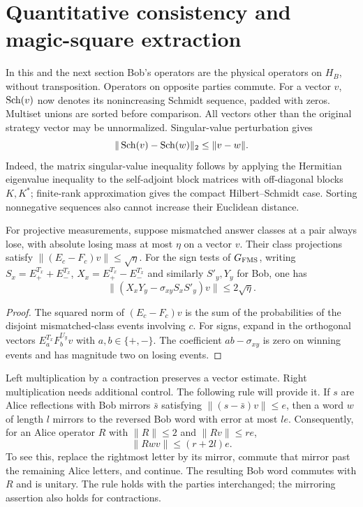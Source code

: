\section{Quantitative consistency and magic-square extraction}\label{sec:extraction}
In this and the next section Bob's operators are the physical operators on
$H_B$, without transposition. Operators on opposite parties commute. For a
vector $v$, $\operatorname{Sch}(v)$ now denotes its nonincreasing Schmidt sequence, padded
with zeros. Multiset unions are sorted before comparison. All vectors other
than the original strategy vector may be unnormalized. Singular-value
perturbation gives
\begin{equation}\label{eq:singularperturbation}
\|\operatorname{Sch}(v)-\operatorname{Sch}(w)\|_2\leq\|v-w\|.
\end{equation}
Indeed, the matrix singular-value inequality follows by applying the
Hermitian eigenvalue inequality to the self-adjoint block matrices with
off-diagonal blocks $K,K^*$; finite-rank approximation gives the compact
Hilbert--Schmidt case. Sorting nonnegative sequences also cannot increase
their Euclidean distance.

\begin{lemma}\label{lem:consistency}
For projective measurements, suppose mismatched answer classes at a pair
always lose, with absolute losing mass at most $\eta$ on a vector $v$.
Their class projections satisfy $\|(E_c-F_c)v\|\leq\sqrt\eta$.
For the sign tests of $G_{\mathrm{FMS}}$, writing $S_x=E^{T_x}_++E^{T_x}_-$,
$X_x=E^{T_x}_+-E^{T_x}_-$ and similarly $S'_y,Y_y$ for Bob, one has
\[
\|(X_xY_y-\sigma_{xy}S_xS'_y)v\|\leq2\sqrt\eta.
\]
\end{lemma}
\begin{proof}
The squared norm of $(E_c-F_c)v$ is the sum of the probabilities of the
disjoint mismatched-class events involving $c$. For signs, expand in the
orthogonal vectors $E^{T_x}_aF^{U_y}_bv$ with $a,b\in\{+,-\}$.
The coefficient $ab-\sigma_{xy}$ is zero on winning events and has magnitude
two on losing events.
\end{proof}

Left multiplication by a contraction preserves a vector estimate. Right
multiplication needs additional control. The following rule will provide it.
If $s$ are Alice reflections with Bob mirrors $\bar s$ satisfying
$\|(s-\bar s)v\|\leq e$, then a word $w$ of length $l$ mirrors to the
reversed Bob word with error at most $le$. Consequently, for an Alice
operator $R$ with $\|R\|\leq2$ and $\|Rv\|\leq re$,
\begin{equation}\label{eq:context}
\|Rwv\|\leq(r+2l)e.
\end{equation}
To see this, replace the rightmost letter by its mirror, commute that
mirror past the remaining Alice letters, and continue. The resulting Bob
word commutes with $R$ and is unitary. The rule holds with the parties
interchanged; the mirroring assertion also holds for contractions.

